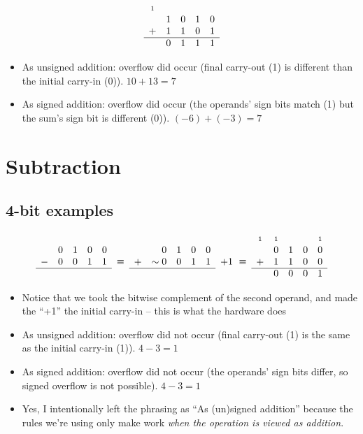\documentclass{article}
\newcommand{\carry}{\scriptstyle 1}
\begin{document}
\begin{equation*}\begin{array}{ccccc}
 \carry & & & & \\
  & 1 & 0 & 1 & 0 \\
+ & 1 & 1 & 0 & 1 \\ \hline
  & 0 & 1 & 1 & 1
\end{array}\end{equation*}

\begin{itemize}
\item As unsigned addition: overflow did occur (final carry-out (1) is
    different than the initial carry-in (0)). $10+13=7$
\item As signed addition: overflow did occur (the operands' sign bits match (1)
    but the sum's sign bit is different (0)). $(-6)+(-3)=7$
\end{itemize}


\section{Subtraction}

\subsection{4-bit examples}

\begin{equation*}\begin{array}{cccccccrcclcccccc}
  &   &   &   &   &        &   &   &   &   &   &            & \carry & \carry & & & \carry \\
  & 0 & 1 & 0 & 0 &        &   & 0 & 1 & 0 & 0 &            &   & 0 & 1 & 0 & 0 \\
- & 0 & 0 & 1 & 1 & \equiv & + &\sim 0 &0&1& 1 & + 1\ \equiv & + & 1 & 1 & 0 & 0 \\ \cline{1-5}\cline{7-11}\cline{13-17}
  &   &   &   &   &        &   &   &   &   &   &            &   & 0 & 0 & 0 & 1
\end{array}\end{equation*}

\begin{itemize}
\item Notice that we took the bitwise complement of the second operand, and made
    the ``+1'' the initial carry-in -- this is what the hardware does
\item As unsigned addition: overflow did not occur (final carry-out (1) is the
    same as the initial carry-in (1)). $4-3=1$
\item As signed addition: overflow did not occur (the operands' sign bits
    differ, so signed overflow is not possible). $4-3=1$
\item Yes, I intentionally left the phrasing as ``As (un)signed addition''
    because the rules we're using only make work \textit{when the operation is
    viewed as addition}.
\end{itemize}
\end{document}
